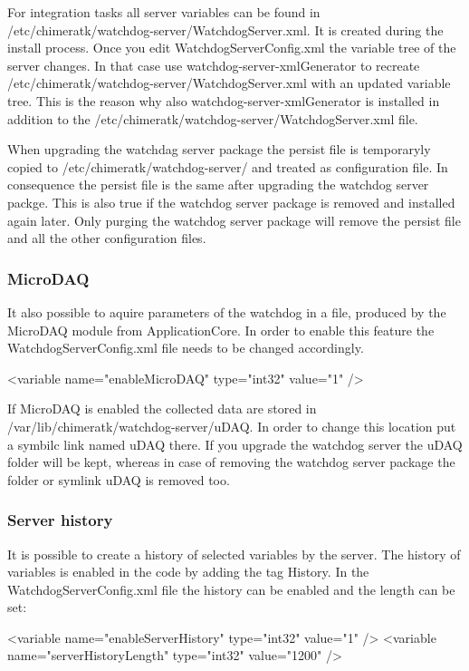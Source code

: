 For integration tasks all server variables can be found in {\ttfamily /etc/chimeratk/watchdog-\/server/\+Watchdog\+Server.xml}. It is created during the install process. Once you edit {\ttfamily Watchdog\+Server\+Config.\+xml} the variable tree of the server changes. In that case use {\ttfamily watchdog-\/server-\/xml\+Generator} to recreate {\ttfamily /etc/chimeratk/watchdog-\/server/\+Watchdog\+Server.xml} with an updated variable tree. This is the reason why also {\ttfamily watchdog-\/server-\/xml\+Generator} is installed in addition to the {\ttfamily /etc/chimeratk/watchdog-\/server/\+Watchdog\+Server.xml} file.

When upgrading the watchdag server package the persist file is temporaryly copied to {\ttfamily /etc/chimeratk/watchdog-\/server/} and treated as configuration file. In consequence the persist file is the same after upgrading the watchdog server packge. This is also true if the watchdog server package is removed and installed again later. Only purging the watchdog server package will remove the persist file and all the other configuration files.

\subsubsection*{Micro\+D\+AQ}

It also possible to aquire parameters of the watchdog in a file, produced by the {\ttfamily Micro\+D\+AQ} module from {\ttfamily Application\+Core}. In order to enable this feature the {\ttfamily Watchdog\+Server\+Config.\+xml} file needs to be changed accordingly. \begin{DoxyVerb}<variable name="enableMicroDAQ" type="int32" value="1" />
\end{DoxyVerb}


If Micro\+D\+AQ is enabled the collected data are stored in {\ttfamily /var/lib/chimeratk/watchdog-\/server/u\+D\+AQ}. In order to change this location put a symbilc link named {\ttfamily u\+D\+AQ} there. If you upgrade the watchdog server the u\+D\+AQ folder will be kept, whereas in case of removing the watchdog server package the folder or symlink {\ttfamily u\+D\+AQ} is removed too.

\subsubsection*{Server history}

It is possible to create a history of selected variables by the server. The history of variables is enabled in the code by adding the tag {\ttfamily History}. In the {\ttfamily Watchdog\+Server\+Config.\+xml} file the history can be enabled and the length can be set\+: \begin{DoxyVerb}<variable name="enableServerHistory" type="int32" value="1" />
<variable name="serverHistoryLength" type="int32" value="1200" /> 
\end{DoxyVerb}


